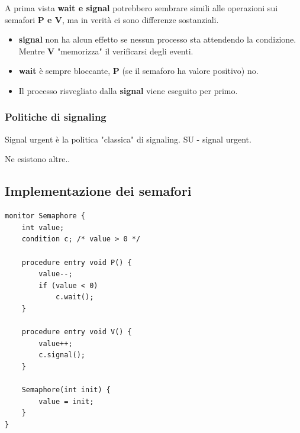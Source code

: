 A prima vista \textbf{wait e signal} potrebbero sembrare simili alle operazioni sui semafori \textbf{P e V}, ma in verità ci sono differenze sostanziali.

\begin{itemize}
    \item \textbf{signal} non ha alcun effetto se nessun processo sta attendendo la condizione. Mentre \textbf{V} "memorizza" il verificarsi degli eventi.
    \item \textbf{wait} è sempre bloccante, \textbf{P} (se il semaforo ha valore positivo) no.
    \item Il processo risvegliato dalla \textbf{signal} viene eseguito per primo.
\end{itemize}

\subsubsection{Politiche di signaling}
Signal urgent è la politica "classica" di signaling.
SU - signal urgent.

Ne esistono altre..

\subsection{Implementazione dei semafori}

\begin{lstlisting}
monitor Semaphore {
    int value;
    condition c; /* value > 0 */

    procedure entry void P() {
        value--;
        if (value < 0)
            c.wait();
    }

    procedure entry void V() {
        value++;
        c.signal();
    }

    Semaphore(int init) {
        value = init;
    }
}
\end{lstlisting}
\newpage

